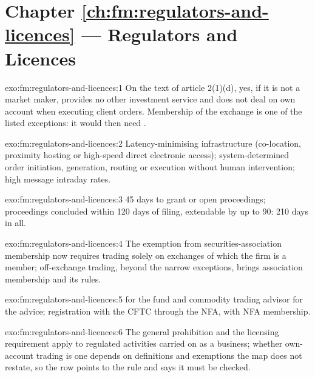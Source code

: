 \section*{Chapter \ref{ch:fm:regulators-and-licences} --- Regulators and Licences}

\begin{solution}{exo:fm:regulators-and-licences:1}
On the text of article 2(1)(d), yes, if it is not a market maker, provides no other investment service and does not deal on own account when
executing client orders. Membership of the exchange is one of the listed exceptions: it would then need .
\end{solution}

\begin{solution}{exo:fm:regulators-and-licences:2}
Latency-minimising infrastructure (co-location, proximity hosting or high-speed direct electronic access); system-determined order initiation,
generation, routing or execution without human intervention; high message intraday rates.
\end{solution}

\begin{solution}{exo:fm:regulators-and-licences:3}
45 days to grant or open proceedings; proceedings concluded within 120 days of filing, extendable by up to 90: 210 days in all.
\end{solution}

\begin{solution}{exo:fm:regulators-and-licences:4}
The exemption from securities-association membership now requires trading solely on exchanges of which the firm is a member; off-exchange
trading, beyond the narrow exceptions, brings association membership and its rules.
\end{solution}

\begin{solution}{exo:fm:regulators-and-licences:5}
 for the fund and commodity trading advisor for the advice; registration with the CFTC through the NFA, with NFA
membership.
\end{solution}

\begin{solution}{exo:fm:regulators-and-licences:6}
The general prohibition and the licensing requirement apply to regulated activities carried on as a business; whether own-account trading is one
depends on definitions and exemptions the map does not restate, so the row points to the rule and says it must be checked.
\end{solution}

